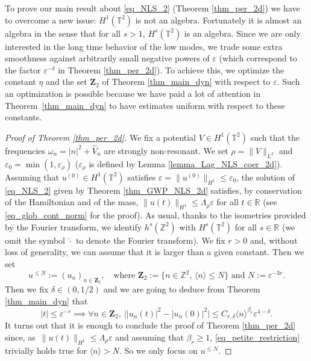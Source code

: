 \documentclass[JEP,XML,SOM,Unicode,NoEqCountersInSection,published]{cedram}
\let\epsilon\varepsilon
\theoremstyle{definition}
\begin{document}
To prove our main result about \eqref{eq_NLS_2} (\ie Theorem \ref{thm_per_2d}) we have to overcome a new issue: $H^1(\mathbb{T}^2)$ is not an algebra. Fortunately it is almost an algebra in the sense that for all $s>1$, $H^s(\mathbb{T}^2)$ is an algebra. Since we are only interested in the long time behavior of the low modes, we trade some extra smoothness against arbitrarily small negative powers of $\varepsilon$ (which correspond to the factor $\varepsilon^{-\delta}$ in Theorem \ref{thm_per_2d}). To achieve this, we optimize the constant $\eta$ and the set $\mathbf{Z}_2$ of Theorem \ref{thm_main_dyn} with respect to $\varepsilon$. Such an optimization is possible because we have paid a lot of attention in Theorem~\ref{thm_main_dyn} to have estimates uniform with respect to these constants.

\begin{proof}[Proof of Theorem \ref{thm_per_2d}] We fix a potential $V\in H^1(\mathbb{T}^2)$ such that the frequencies $\omega_n = |n|^2 + \widehat{V}_n$ are strongly non-resonant. We set $\rho = \|V\|_{L^2}$ and $\epsilon_0 = \min(1,\varepsilon_{\rho})$ ($\varepsilon_{\rho}$ is defined by Lemma \ref{lemma_Lag_NLS_coer_2d}). Assuming that $u^{(0)}\in H^1(\mathbb{T}^2)$ satisfies $\varepsilon = \| u^{(0)} \|_{H^1} \leq \epsilon_0$, the solution of \eqref{eq_NLS_2} given by Theorem \ref{thm_GWP_NLS_2d} satisfies, by conservation of the Hamiltonian and of the mass, $\| u(t) \|_{H^1}\leq \Lambda_\rho \varepsilon$ for all $t\in \mathbb{R}$ (see \eqref{eq_glob_cont_norm} for the proof). As usual, thanks to the isometries provided by the Fourier transform, we identify $h^s(\mathbb{Z}^2)$ with $H^s(\mathbb{T}^2)$ for all $s\in \mathbb{R}$ (we omit the symbol $\widehat{\cdot}$ to denote the Fourier transform). We fix $r>0$ and, without loss of generality, we can assume that it is larger than a given constant. Then we set
\[
u^{\leq N}:= (u_n)_{n\in \mathbf{Z}_2}, \quad \text{where } \mathbf{Z}_2:= \{ n \in\mathbb{Z}^2, \, \langle n \rangle \leq N\} \text{ and } N:= \varepsilon^{-3r}.
\]
Then we fix $\delta\in (0,1/2)$ and we are going to deduce from Theorem \ref{thm_main_dyn} that
\begin{equation}
\label{eq_petite_restriction}
|t| \leq \varepsilon^{-r} \implies \forall n \in \mathbf{Z}_2, \ \bigl||u_n(t)|^2 - |u_n(0)|^2 \bigr| \leq C_{r,\delta} \langle n \rangle^{\beta_r} \varepsilon^{4-\delta}.
\end{equation}
It turns out that it is enough to conclude the proof of Theorem \ref{thm_per_2d} since, as~$\|u(t)\|_{H^1} \leq \Lambda_\rho \varepsilon$ and assuming that $\beta_r\geq 1$, \eqref{eq_petite_restriction} trivially holds true for $\langle n \rangle > N$. So we only focus on $u^{\leq N}$.


\end{proof}
\end{document}
